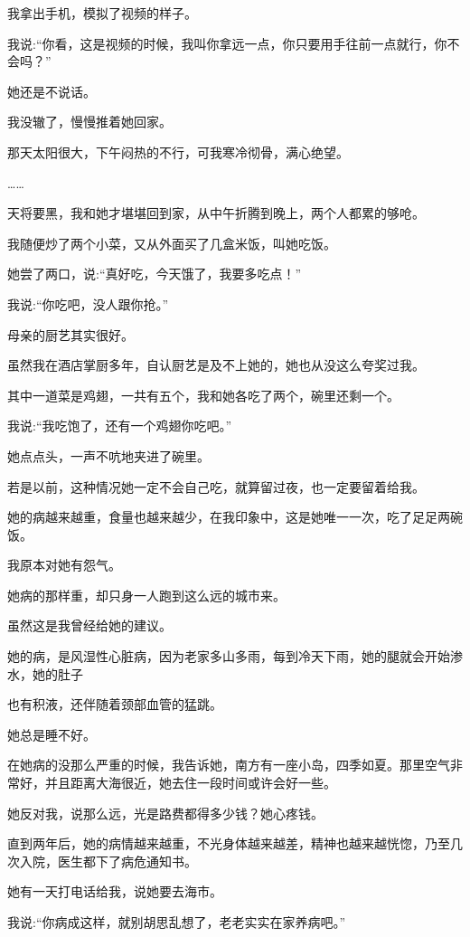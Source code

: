 \documentclass{article}
\begin{document}
我拿出手机，模拟了视频的样子。

我说:“你看，这是视频的时候，我叫你拿远一点，你只要用手往前一点就行，你不会吗？”

她还是不说话。

我没辙了，慢慢推着她回家。

那天太阳很大，下午闷热的不行，可我寒冷彻骨，满心绝望。

……

天将要黑，我和她才堪堪回到家，从中午折腾到晚上，两个人都累的够呛。

我随便炒了两个小菜，又从外面买了几盒米饭，叫她吃饭。

\newpage 



她尝了两口，说:“真好吃，今天饿了，我要多吃点！”

我说:“你吃吧，没人跟你抢。”

母亲的厨艺其实很好。

虽然我在酒店掌厨多年，自认厨艺是及不上她的，她也从没这么夸奖过我。

其中一道菜是鸡翅，一共有五个，我和她各吃了两个，碗里还剩一个。

我说:“我吃饱了，还有一个鸡翅你吃吧。”

她点点头，一声不吭地夹进了碗里。

若是以前，这种情况她一定不会自己吃，就算留过夜，也一定要留着给我。

她的病越来越重，食量也越来越少，在我印象中，这是她唯一一次，吃了足足两碗饭。

我原本对她有怨气。

她病的那样重，却只身一人跑到这么远的城市来。

虽然这是我曾经给她的建议。

她的病，是风湿性心脏病，因为老家多山多雨，每到冷天下雨，她的腿就会开始渗水，她的肚子

\newpage 

也有积液，还伴随着颈部血管的猛跳。

她总是睡不好。

在她病的没那么严重的时候，我告诉她，南方有一座小岛，四季如夏。那里空气非常好，并且距离大海很近，她去住一段时间或许会好一些。

她反对我，说那么远，光是路费都得多少钱？她心疼钱。

直到两年后，她的病情越来越重，不光身体越来越差，精神也越来越恍惚，乃至几次入院，医生都下了病危通知书。

她有一天打电话给我，说她要去海市。

我说:“你病成这样，就别胡思乱想了，老老实实在家养病吧。”
\end{document}
